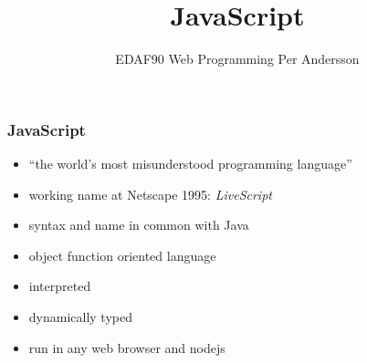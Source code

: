 \documentclass[aspectratio=1610]{beamer}
\title[JavaScript]{JavaScript}
\author[EDAF90]{%
  EDAF90 Web Programming\newline
  Per Andersson}
\begin{document}
\begin{frame}[plain]%
  \titlepage
\end{frame}

\begin{frame}
  \frametitle{JavaScript}

\begin{itemize}
\item ``the world's most misunderstood programming language''
\item working name at Netscape 1995: \emph{LiveScript}
\item syntax and name in common with Java
\item object function oriented language
\item interpreted
\item dynamically typed 
\item run in any web browser and nodejs
\end{itemize}

\end{frame}
















\end{document}
